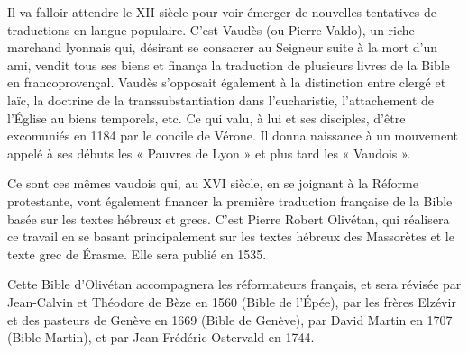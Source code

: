 \begin{small}
Il va falloir attendre le XII siècle pour voir émerger de nouvelles tentatives de traductions en langue populaire. C'est Vaudès (ou Pierre Valdo), un riche marchand lyonnais qui, désirant se consacrer au Seigneur suite à la mort d'un ami, vendit tous ses biens et finança la traduction de plusieurs livres de la Bible en francoprovençal. Vaudès s'opposait également à la distinction entre clergé et laïc, la doctrine de la transsubstantiation dans l'eucharistie, l'attachement de l'Église au biens temporels, etc. Ce qui valu, à lui et ses disciples, d'être excomuniés en 1184 par le concile de Vérone. Il donna naissance à un mouvement appelé à ses débuts les « Pauvres de Lyon » et plus tard les « Vaudois ».\bigskip

Ce sont ces mêmes vaudois qui, au XVI siècle, en se joignant à la Réforme protestante, vont également financer la première traduction française de la Bible basée sur les textes hébreux et grecs. C'est Pierre Robert Olivétan, qui réalisera ce travail en se basant principalement sur les textes hébreux des Massorètes et le texte grec de Érasme. Elle sera publié en 1535.\bigskip

Cette Bible d'Olivétan accompagnera les réformateurs français, et sera révisée par Jean-Calvin et Théodore de Bèze en 1560 (Bible de l'Épée), par les frères Elzévir et des pasteurs de Genève en 1669 (Bible de Genève), par David Martin en 1707 (Bible Martin), et par Jean-Frédéric Ostervald en 1744.
\end{small}

